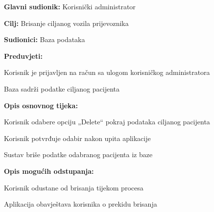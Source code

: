 					\noindent {}
					\begin{packed_item}
						\item \textbf{Glavni sudionik:} Korisnički administrator
						\item  \textbf{Cilj:} Brisanje ciljanog vozila prijevoznika
						\item  \textbf{Sudionici:} Baza podataka
						\item  \textbf{Preduvjeti:}
						\item[] \begin{packed_enum}
							\item Korisnik je prijavljen na račun sa ulogom korisničkog administratora
							\item Baza sadrži podatke ciljanog pacijenta
						\end{packed_enum}
						
						\item  \textbf{Opis osnovnog tijeka:}
						\item[] \begin{packed_enum}
							\item Korisnik odabere opciju „Delete“ pokraj podataka ciljanog pacijenta
							\item Korisnik potvrđuje odabir nakon upita aplikacije
							\item Sustav briše podatke odabranog pacijenta iz baze
						\end{packed_enum}
						
						\item  \textbf{Opis mogućih odstupanja:}
						\item[] \begin{packed_item}
							\item[2.a] Korisnik odustane od brisanja tijekom procesa
							\item[] \begin{packed_enum}
								\item Aplikacija obavještava korisnika o prekidu brisanja
							\end{packed_enum}
						\end{packed_item}
					\end{packed_item}
					
